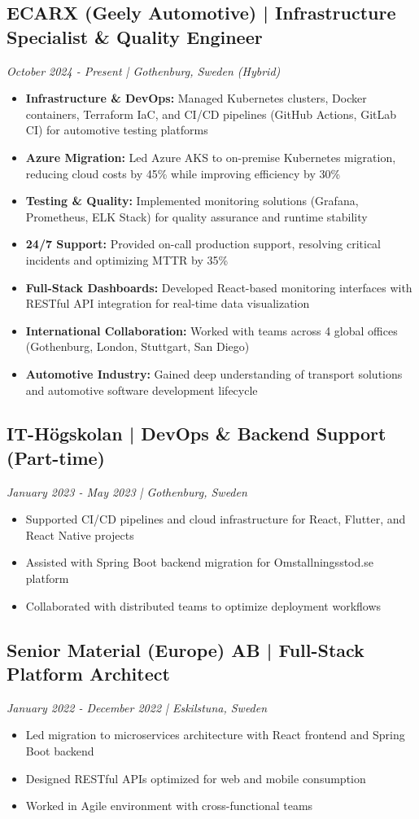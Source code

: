 \documentclass[11pt,a4paper]{article}
\begin{document}
\subsection*{ECARX (Geely Automotive) | Infrastructure Specialist \& Quality Engineer}
\textit{October 2024 - Present | Gothenburg, Sweden (Hybrid)}
\begin{itemize}[noitemsep]
\item \textbf{Infrastructure \& DevOps:} Managed Kubernetes clusters, Docker containers, Terraform IaC, and CI/CD pipelines (GitHub Actions, GitLab CI) for automotive testing platforms
\item \textbf{Azure Migration:} Led Azure AKS to on-premise Kubernetes migration, reducing cloud costs by 45\% while improving efficiency by 30\%
\item \textbf{Testing \& Quality:} Implemented monitoring solutions (Grafana, Prometheus, ELK Stack) for quality assurance and runtime stability
\item \textbf{24/7 Support:} Provided on-call production support, resolving critical incidents and optimizing MTTR by 35\%
\item \textbf{Full-Stack Dashboards:} Developed React-based monitoring interfaces with RESTful API integration for real-time data visualization
\item \textbf{International Collaboration:} Worked with teams across 4 global offices (Gothenburg, London, Stuttgart, San Diego)
\item \textbf{Automotive Industry:} Gained deep understanding of transport solutions and automotive software development lifecycle
\end{itemize}

\subsection*{IT-Högskolan | DevOps \& Backend Support (Part-time)}
\textit{January 2023 - May 2023 | Gothenburg, Sweden}
\begin{itemize}[noitemsep]
\item Supported CI/CD pipelines and cloud infrastructure for React, Flutter, and React Native projects
\item Assisted with Spring Boot backend migration for Omstallningsstod.se platform
\item Collaborated with distributed teams to optimize deployment workflows
\end{itemize}

\subsection*{Senior Material (Europe) AB | Full-Stack Platform Architect}
\textit{January 2022 - December 2022 | Eskilstuna, Sweden}
\begin{itemize}[noitemsep]
\item Led migration to microservices architecture with React frontend and Spring Boot backend
\item Designed RESTful APIs optimized for web and mobile consumption
\item Worked in Agile environment with cross-functional teams
\end{itemize}
\end{document}
